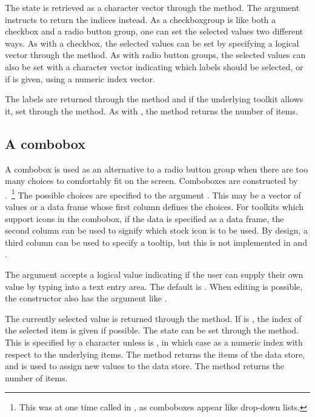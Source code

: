The state is retrieved as a character vector through the
 method. The  argument
instructs  to return the indices instead. As a
checkboxgroup is like both a checkbox and a radio button group, one
can set the selected values two different ways. As with a checkbox, 
the selected values can be set by specifying a logical vector through the
 method. As with radio button groups,
the selected values can also be set with a character vector indicating
which labels should be selected, or if  is given,
using a numeric index vector.

The labels are returned through the \method{[}{gcheckboxgroup} method
and if the underlying toolkit allows it, set through the
\method{[\ASSIGN}{gcheckboxgroup} method. As with ,
the  method returns the number of items.

\subsection{A combobox}
\label{sec:gWidgets-combobox}

A combobox is used as an alternative to a radio button group when
there are too many choices to comfortably fit on the screen. Comboboxes are
constructed by .~\footnote{This was at one time
  called  in , as comboboxes appear like
  drop-down lists.} The possible choices are specified to the argument
. This may be a vector of values or a data
frame whose first column defines the choices. For toolkits which
support icons in the combobox, if the data is specified as a data
frame, the second column can be used to signify which stock icon is to
be used. By design, a third column can be used to specify a tooltip,
but this is not implemented in  and . 

The argument  accepts a logical value
indicating if the user can supply their own value by typing into a
text entry area. The default is . When editing is possible, the constructor also
has the  argument like
.

The currently selected value is returned through the
 method. If  is , the
index of the selected item is given if possible. The state can be set
through the  method. This is
specified by a character unless  is , in which
case as a numeric index with respect to the underlying items. The
\method{[}{gcombobox} method returns the items of the data store, and
\method{[\ASSIGN}{gcombobox} is used to assign new values to the data
store. The  method returns the number of items.

